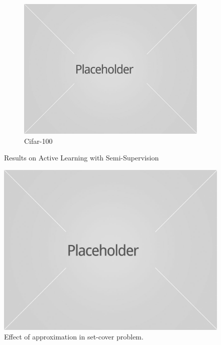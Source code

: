 \documentclass{article}
\begin{document}
\begin{figure}
    \begin{subfigure}[b]{0.3239\textwidth}
        \includegraphics[width=\textwidth]{placeholder1.jpg}
        \caption{Cifar-100}
    \end{subfigure}
    \caption{Results on Active Learning with Semi-Supervision}\label{fig:ressemi}
\end{figure}


\begin{figure}[h]
\includegraphics[width=\columnwidth]{placeholder1.jpg}
\caption{Effect of approximation in set-cover problem.}
\label{mip}
\end{figure}
\end{document}
